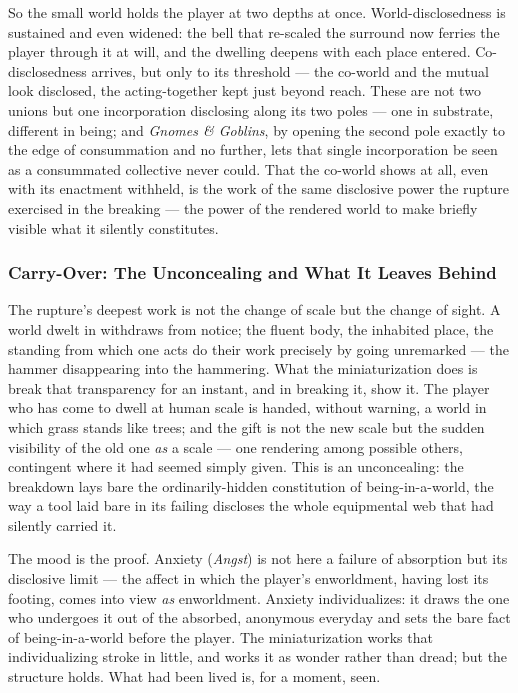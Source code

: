 So the small world holds the player at two depths at once. World-disclosedness is sustained and even widened: the bell that re-scaled the surround now ferries the player through it at will, and the dwelling deepens with each place entered. Co-disclosedness arrives, but only to its threshold — the co-world and the mutual look disclosed, the acting-together kept just beyond reach. These are not two unions but one incorporation disclosing along its two poles — one in substrate, different in being; and \textit{Gnomes \& Goblins}, by opening the second pole exactly to the edge of consummation and no further, lets that single incorporation be seen as a consummated collective never could. That the co-world shows at all, even with its enactment withheld, is the work of the same disclosive power the rupture exercised in the breaking — the power of the rendered world to make briefly visible what it silently constitutes.

\subsubsection*{Carry-Over: The Unconcealing and What It Leaves Behind}

The rupture's deepest work is not the change of scale but the change of sight. A world dwelt in withdraws from notice; the fluent body, the inhabited place, the standing from which one acts do their work precisely by going unremarked — the hammer disappearing into the hammering. What the miniaturization does is break that transparency for an instant, and in breaking it, show it. The player who has come to dwell at human scale is handed, without warning, a world in which grass stands like trees; and the gift is not the new scale but the sudden visibility of the old one \textit{as} a scale — one rendering among possible others, contingent where it had seemed simply given. This is an unconcealing: the breakdown lays bare the ordinarily-hidden constitution of being-in-a-world, the way a tool laid bare in its failing discloses the whole equipmental web that had silently carried it.

The mood is the proof. Anxiety (\textit{Angst}) is not here a failure of absorption but its disclosive limit — the affect in which the player's enworldment, having lost its footing, comes into view \textit{as} enworldment. Anxiety individualizes: it draws the one who undergoes it out of the absorbed, anonymous everyday and sets the bare fact of being-in-a-world before the player. The miniaturization works that individualizing stroke in little, and works it as wonder rather than dread; but the structure holds. What had been lived is, for a moment, seen.

